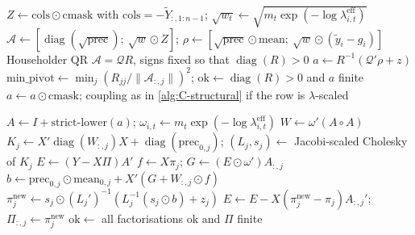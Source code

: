 \begin{algorithm}[!htbp]
\caption{Contemporaneous row $a_i$ by QR, for non-fusing means and the reduced form
(, ; ). The
target is $\tilde y_i - g_i = -\tilde y_{<i}\,a_i + e_i$.}
\label{alg:C-qr}
\footnotesize
\begin{algorithmic}[1]
\State $Z \gets \mathrm{cols}\odot\mathrm{cmask}$ with $\mathrm{cols} = -\tilde Y_{:,1:n-1}$; $\sqrt{w_t} \gets \sqrt{m_t\exp(-\log\lambda^{\mathrm{eff}}_{i,t})}$
\State $\mathcal{A} \gets [\operatorname{diag}(\sqrt{\mathrm{prec}});\ \sqrt{w}\odot Z]$; $\rho \gets [\sqrt{\mathrm{prec}}\odot\mathrm{mean};\ \sqrt{w}\odot(\tilde y_i - g_i)]$ 
\State Householder QR $\mathcal{A} = \mathcal{Q}R$, signs fixed so that $\operatorname{diag}(R) > 0$ 
\State $a \gets R^{-1}(\mathcal{Q}'\rho + z)$ 
\State $\mathrm{min\_pivot} \gets \min_j (R_{jj}/\|\mathcal{A}_{:,j}\|)^2$; $\mathrm{ok} \gets \operatorname{diag}(R) > 0$ and $a$ finite
\State $a \gets a\odot\mathrm{cmask}$; coupling as in \cref{alg:C-structural} if the row is $\lambda$-scaled
\end{algorithmic}
\end{algorithm}

\begin{algorithm}[!htbp]
\caption{One corrected triangular (CCCM) scan for the reduced-form coefficients
(, ), following
\citet{carriero2022corrigendum}.}
\label{alg:C-cccm}
\footnotesize
\begin{algorithmic}[1]
\State $A \gets I + \text{strict-lower}(a)$; $\omega_{i,t} \gets m_t\exp(-\log\lambda^{\mathrm{eff}}_{i,t})$
\State $W \gets \omega'(A\circ A)$ 
 
  \State $K_j \gets X'\operatorname{diag}(W_{:,j})X + \operatorname{diag}(\mathrm{prec}_{0,j})$; $(L_j, s_j) \gets$ Jacobi-scaled Cholesky of $K_j$
\EndFor
\State $E \gets (Y - X\Pi)A'$ 
  \State $f \gets X\pi_j$; $G \gets (E\odot\omega')A_{:,j}$ 
  \State $b \gets \mathrm{prec}_{0,j}\odot\mathrm{mean}_{0,j} + X'(G + W_{:,j}\odot f)$
  \State $\pi_j^{\mathrm{new}} \gets s_j\odot(L_j')^{-1}(L_j^{-1}(s_j\odot b) + z_j)$
  \State $E \gets E - X(\pi_j^{\mathrm{new}} - \pi_j)A_{:,j}'$; $\Pi_{:,j} \gets \pi_j^{\mathrm{new}}$
\EndFor
\State $\mathrm{ok} \gets$ all factorisations ok and $\Pi$ finite
\end{algorithmic}
\end{algorithm}

